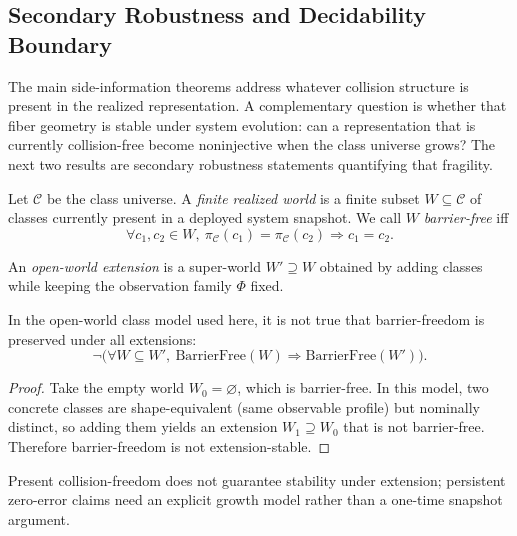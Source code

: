 \subsection{Secondary Robustness and Decidability Boundary}

The main side-information theorems address whatever collision structure is present in the realized representation. A complementary question is whether that fiber geometry is stable under system evolution: can a representation that is currently collision-free become noninjective when the class universe grows? The next two results are secondary robustness statements quantifying that fragility.

\begin{definition}
Let $\mathcal{C}$ be the class universe. A \emph{finite realized world} is a finite subset $W \subseteq \mathcal{C}$ of classes currently present in a deployed system snapshot. We call $W$ \emph{barrier-free} iff
\[
\forall c_1,c_2 \in W,\ \pi_{\mathcal C}(c_1)=\pi_{\mathcal C}(c_2) \Rightarrow c_1=c_2.
\]
\end{definition}

\begin{definition}
An \emph{open-world extension} is a super-world $W' \supseteq W$ obtained by adding classes while keeping the observation family $\Phi$ fixed.
\end{definition}

\begin{theorem}\label{thm:open-world-extension-instability}
In the open-world class model used here, it is not true that barrier-freedom is preserved under all extensions:
\[
\neg\Big(\forall W \subseteq W',\ \mathrm{BarrierFree}(W)\Rightarrow \mathrm{BarrierFree}(W')\Big).
\]
\end{theorem}

\begin{proof}
Take the empty world $W_0=\varnothing$, which is barrier-free. In this model, two concrete classes are shape-equivalent (same observable profile) but nominally distinct, so adding them yields an extension $W_1\supseteq W_0$ that is not barrier-free. Therefore barrier-freedom is not extension-stable.
\end{proof}

\begin{remark}
Present collision-freedom does not guarantee stability under extension; persistent zero-error claims need an explicit growth model rather than a one-time snapshot argument.
\end{remark}

